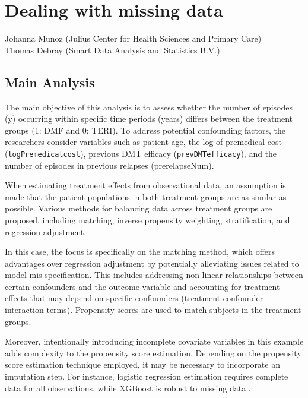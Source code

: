 \documentclass[
  letterpaper,
  DIV=11,
  numbers=noendperiod]{scrreprt}
\begin{document}


\hypertarget{dealing-with-missing-data}{%
\chapter{Dealing with missing data}\label{dealing-with-missing-data}}

Johanna Munoz (Julius Center for Health Sciences and Primary Care)\\
Thomas Debray (Smart Data Analysis and Statistics B.V.)

\hfill\break

\hypertarget{main-analysis}{%
\section{Main Analysis}\label{main-analysis}}

The main objective of this analysis is to assess whether the number of
episodes (y) occurring within specific time periods (years) differs
between the treatment groups (1: DMF and 0: TERI). To address potential
confounding factors, the researchers consider variables such as patient
age, the log of premedical cost (\texttt{logPremedicalcost}), previous
DMT efficacy (\texttt{prevDMTefficacy}), and the number of episodes in
previous relapses (prerelapseNum).

When estimating treatment effects from observational data, an assumption
is made that the patient populations in both treatment groups are as
similar as possible. Various methods for balancing data across treatment
groups are proposed, including matching, inverse propensity weighting,
stratification, and regression adjustment.

In this case, the focus is specifically on the matching method, which
offers advantages over regression adjustment by potentially alleviating
issues related to model mis-specification. This includes addressing
non-linear relationships between certain confounders and the outcome
variable and accounting for treatment effects that may depend on
specific confounders (treatment-confounder interaction terms).
Propensity scores are used to match subjects in the treatment groups.

Moreover, intentionally introducing incomplete covariate variables in
this example adds complexity to the propensity score estimation.
Depending on the propensity score estimation technique employed, it may
be necessary to incorporate an imputation step. For instance, logistic
regression estimation requires complete data for all observations, while
XGBoost is robust to missing data \cite{zhao_propensity_2021}.
\end{document}
